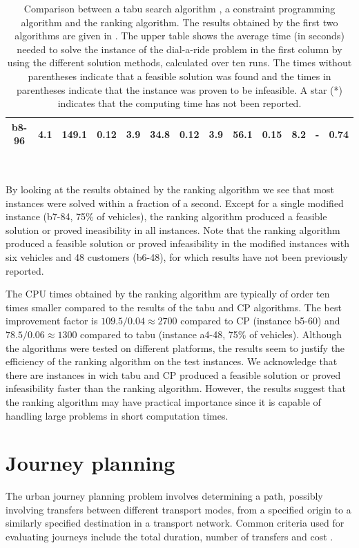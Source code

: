 \documentclass[dissertation,draft*]{aaltoseries}
\begin{document}
\begin{table}
{\begin{center}
\begin{tabular}{|c|ccc|ccc|ccc|ccc|}
\hline
b8-96 & 4.1 & 149.1 & 0.12 & 3.9 & 34.8 & 0.12 & 3.9 & 56.1 &0.15& 8.2 & - &0.74 \\ %
\hline
\end{tabular} \\ 
\end{center}
\caption{Comparison between a tabu search algorithm \citep{cordeau02}, 
a constraint programming algorithm \citep{berbegliathesis} and the ranking algorithm.
The results obtained by the first two algorithms are given in \citep{berbegliathesis,berbegliafeas}.
The upper table shows the average time (in seconds) needed to solve the
instance of the dial-a-ride problem in the first column by using the different solution methods,
calculated over ten runs. The times without parentheses indicate that a feasible solution was found and 
the times in parentheses indicate that the instance was proven to be infeasible. A star (*) indicates that 
the computing time has not been reported.
}
\label{comparisontable}
}
\end{table}

By looking at the results obtained by the ranking algorithm we see that most instances
were solved within a fraction of a second. 
Except for a single modified instance (b7-84, 75\% of vehicles), the 
ranking algorithm produced a feasible solution or proved ineasibility in all instances.
Note that the ranking algorithm produced a feasible solution or proved infeasibility in 
the modified instances with six vehicles and 48 customers (b6-48), for which results have not been previously reported.

The CPU times obtained by the ranking algorithm are 
typically of order ten times smaller
compared to the results of the tabu and CP algorithms. 
The best improvement factor is 
$109.5 / 0.04 \approx 2 700$ compared to CP (instance b5-60)
and $78.5/0.06 \approx 1300$ compared to tabu (instance a4-48, 75\% of vehicles).
Although the algorithms
were tested on different platforms, the results seem to justify the efficiency of the 
ranking algorithm on the test instances. We acknowledge that 
there are instances in wich tabu and CP produced a feasible solution or 
proved infeasibility faster than the ranking algorithm.
However, the results suggest that the ranking algorithm may have practical importance
since it is capable of handling large problems in short computation times.



\chapter{Journey planning}
\label{journeyplanning}
The urban journey planning problem involves
determining a path, possibly involving transfers between different transport modes, 
from a specified origin to a similarly specified destination 
in a transport network. Common criteria used for evaluating journeys
include the total duration, number of transfers and cost \cite{androutsopoulos, 
zografos,peng,modesti,huang, huang2, horn2003, tong, tong2, ziliaskopoulos, 
berube, cooke, cai, chabini, kostreva, hamacher, bander,tan}.
\end{document}
